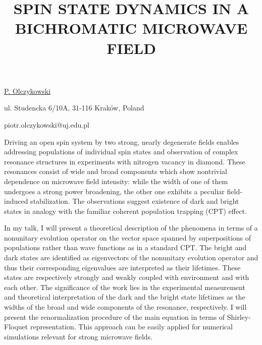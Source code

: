 \title{SPIN STATE DYNAMICS IN A BICHROMATIC MICROWAVE FIELD}

\underline{P. Olczykowski} 

{\normalsize{\vspace{-4mm}
ul. Studencka 6/10A,
31-116 Krak\'ow,
Poland



\email piotr.olczykowski@uj.edu.pl}}

Driving an open spin system by two strong, nearly degenerate fields enables addressing populations of individual spin states and observation of complex resonance structures in experiments with nitrogen vacancy in diamond. These resonances consist of wide and broad components which show nontrivial dependence on microwave field intensity: while the width of one of them undergoes a strong power broadening, the other one exhibits a peculiar field-induced stabilization. The observations suggest existence of dark and bright states in analogy with the familiar coherent population trapping (CPT) effect.

In my talk, I will present a theoretical description of the phenomena in terms of a nonunitary evolution operator on the vector space spanned by superpositions of populations rather than wave functions as in a standard CPT. The bright and dark states are identified as eigenvectors of the nonunitary evolution operator and thus their corresponding eigenvalues are interpreted as their lifetimes. These states are respectively strongly and weakly coupled with environment and with each other. The significance of the work lies in the experimental measurement and theoretical interpretation of the dark and the bright state lifetimes as the widths of the broad and wide components of the resonance, respectively. I will present the renormalization procedure of the main equation in terms of Shirley-Floquet representation. This approach can be easily applied for numerical simulations relevant for strong microwave fields.


\vspace{\baselineskip}